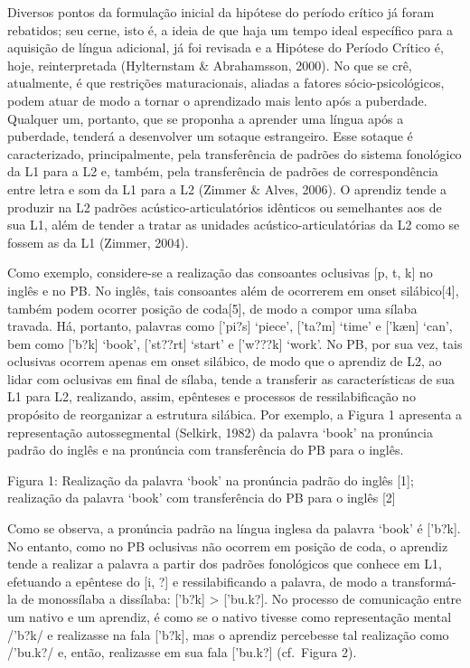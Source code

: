 Diversos pontos da formula\c{c}\~ao inicial da hip\'otese do per\'iodo cr\'itico j\'a
foram rebatidos; seu cerne, isto \'e, a ideia de que haja um tempo ideal
espec\'ifico para a aquisi\c{c}\~ao de l\'ingua adicional, j\'a foi revisada e a
Hip\'otese do Per\'iodo Cr\'itico \'e, hoje, reinterpretada (Hylternstam \&
Abrahamsson, 2000). No que se cr\^e, atualmente, \'e que restri\c{c}\~oes
maturacionais, aliadas a fatores s\'ocio-psicol\'ogicos, podem atuar de modo
a tornar o aprendizado mais lento ap\'os a puberdade. Qualquer um,
portanto, que se proponha a aprender uma l\'ingua ap\'os a puberdade,
tender\'a a desenvolver um sotaque estrangeiro. Esse sotaque \'e
caracterizado, principalmente, pela transfer\^encia de padr\~oes do sistema
fonol\'ogico da L1 para a L2 e, tamb\'em, pela transfer\^encia de padr\~oes de
correspond\^encia entre letra e som da L1 para a L2 (Zimmer \& Alves,
2006). O aprendiz tende a produzir na L2 padr\~oes ac\'ustico-articulat\'orios
id\^enticos ou semelhantes aos de sua L1, al\'em de tender a tratar as
unidades ac\'ustico-articulat\'orias da L2 como se fossem as da L1 (Zimmer,
2004).

Como exemplo, considere-se a realiza\c{c}\~ao das consoantes  oclusivas  [p,
t, k{]} no ingl\^es e no PB. No ingl\^es, tais consoantes al\'em de ocorrerem
em onset sil\'abico{[}4{]}, tamb\'em podem ocorrer posi\c{c}\~ao de coda{[}5{]},
de modo a compor uma s\'ilaba travada. H\'a, portanto, palavras como
{[}'pi?s{]} `piece', {[}'ta?m{]} `time' e {[}'kæn{]} `can', bem como
{[}'b?k{]} `book', {[}'st??rt{]} `start' e {[}'w???k{]} `work'. No PB,
por sua vez, tais oclusivas ocorrem apenas em onset sil\'abico, de modo
que o aprendiz de L2, ao lidar com oclusivas em final de s\'ilaba, tende a
transferir as caracter\'isticas de sua L1 para L2, realizando, assim,
ep\^enteses e processos de ressilabifica\c{c}\~ao no prop\'osito de reorganizar a
estrutura sil\'abica. Por exemplo, a Figura 1 apresenta a representa\c{c}\~ao
autossegmental (Selkirk, 1982) da palavra `book' na pron\'uncia padr\~ao do
ingl\^es e na pron\'uncia com transfer\^encia do PB para o ingl\^es.

Figura 1: Realiza\c{c}\~ao da palavra `book' na pron\'uncia padr\~ao do ingl\^es
{[}1{]}; realiza\c{c}\~ao da palavra `book' com transfer\^encia do PB para o
ingl\^es {[}2{]}

Como se observa, a pron\'uncia padr\~ao na l\'ingua inglesa da palavra `book'
\'e {[}'b?k{]}. No entanto, como no PB oclusivas n\~ao ocorrem em posi\c{c}\~ao de
coda, o aprendiz tende a realizar a palavra a partir dos padr\~oes
fonol\'ogicos que conhece em L1, efetuando a ep\^entese do {[}i, ?{]} e
ressilabificando a palavra, de modo a transform\'a-la de monoss\'ilaba a
diss\'ilaba: {[}'b?k{]} \textgreater{} {[}'bu.k?{]}. No processo de
comunica\c{c}\~ao entre um nativo e um aprendiz, \'e como se o nativo tivesse
como representa\c{c}\~ao mental /'b?k/ e realizasse na fala {[}'b?k{]}, mas o
aprendiz percebesse tal realiza\c{c}\~ao como /'bu.k?/ e, ent\~ao, realizasse em
sua fala {[}'bu.k?{]} (cf.~Figura 2).

